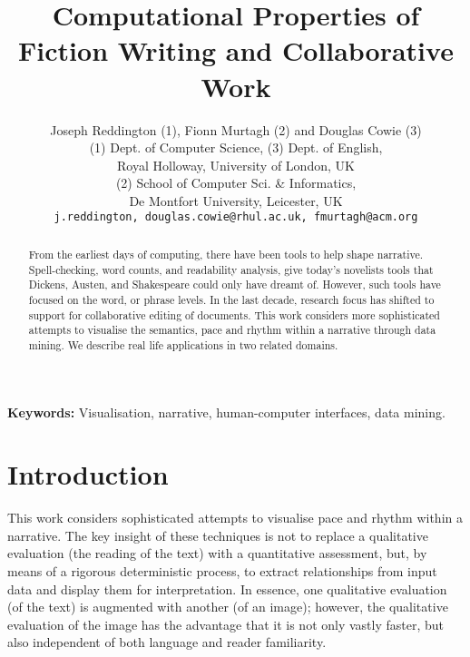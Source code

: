 \documentclass{article}
\begin{document}
\title{Computational Properties of Fiction Writing and Collaborative Work}


\author{Joseph Reddington (1), Fionn Murtagh (2) and  Douglas Cowie (3) \\
(1) Dept. of Computer Science, (3) Dept. of English, \\
Royal Holloway, University of London, UK\\
(2) School of Computer Sci. \& Informatics, \\
De Montfort University, Leicester, UK \\
{\tt j.reddington, douglas.cowie@rhul.ac.uk, fmurtagh@acm.org}}



\maketitle

\newcommand{\naive}{na\"\i ve }
\newcommand{\naively}{na\"\i vely }

\begin{abstract}
From the earliest days of computing, there have been tools to help shape narrative.  Spell-checking, word counts, and readability analysis,  give today's novelists tools that Dickens, Austen, and Shakespeare could only have dreamt of.  However,  such tools have focused on the word, or phrase levels. In the last decade, research focus has shifted to support for collaborative editing of documents.
This work considers more sophisticated attempts to visualise the semantics, pace and rhythm within a narrative through data mining.  We describe real life applications in two related domains. 
\end{abstract}


\noindent
{\bf Keywords:}
Visualisation, narrative, human-computer interfaces, data mining.



\section{Introduction}
\label{intro}
This work considers sophisticated attempts to visualise pace and rhythm within a narrative. 
The key insight of these techniques is not to replace a qualitative evaluation (the reading of the text) with a quantitative assessment, but, by means of a rigorous deterministic process, to extract relationships from input data and display them for interpretation.  In essence, one qualitative evaluation (of the text) is augmented with another (of an image); however, the qualitative evaluation of the image has the advantage that it is not only vastly faster, but also independent of both language and reader familiarity. 
\end{document}

